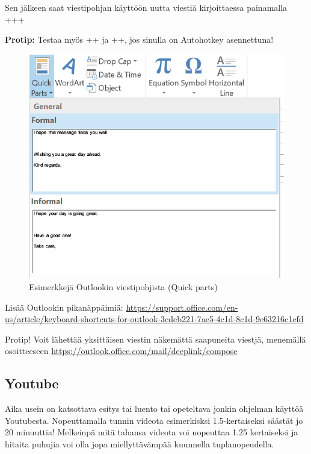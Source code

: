 \documentclass[a4paper,12pt]{scrartcl}
\begin{document}
Sen jälkeen saat viestipohjan käyttöön uutta viestiä kirjoittaessa painamalla \\ +++\keys{\return}

\textbf{Protip:} Testaa myös \keys{\ctrl}++ ja \keys{\ctrl}++, jos sinulla on Autohotkey asennettuna!

\begin{figure}[H]
	\includegraphics[width=\linewidth]{img/Quick_parts.png}
	\caption{Esimerkkejä Outlookin viestipohjista (Quick parts)}
	\label{fig:Quick_parts}
\end{figure}

\medskip

Lisää Outlookin pikanäppäimiä: \url{https://support.office.com/en-us/article/keyboard-shortcuts-for-outlook-3cdeb221-7ae5-4c1d-8c1d-9e63216c1efd}

Protip! Voit lähettää yksittäisen viestin näkemättä saapuneita viestjä, menemällä osoitteeseen \url{https://outlook.office.com/mail/deeplink/compose}

\subsection{Youtube}

Aika usein on katsottava esitys tai luento tai opeteltava jonkin ohjelman käyttöä Youtubesta. Nopeuttamalla tunnin videota esimerkisksi 1.5-kertaiseksi säästät jo 20 minuuttia! Melkeinpä mitä tahansa videota voi nopeuttaa 1.25 kertaiseksi ja hitaita puhujia voi olla jopa miellyttävämpää kuunnella tuplanopeudella.
\end{document}
